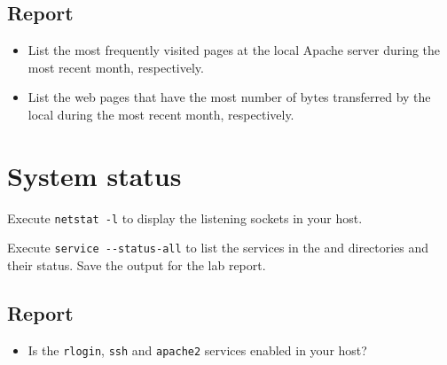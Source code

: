 \documentclass{../UTNetLab}
\begin{document}
	\subsection*{Report}
	\begin{itemize}
		\item List the most frequently visited pages at the local Apache server during the most recent month, respectively.
		\item List the web pages that have the most number of bytes transferred by the local during the most recent month, respectively.
	\end{itemize}

\section{System status}
	Execute \lstinline{netstat -l} to display the listening sockets in your host.

	Execute \lstinline{service --status-all} to list the services in the  and  directories and their status. Save the output for the lab report.
	
	\subsection*{Report}
	\begin{itemize}
		\item Is the \lstinline{rlogin}, \lstinline{ssh} and \lstinline{apache2} services enabled in your host?
	\end{itemize}
\end{document}
